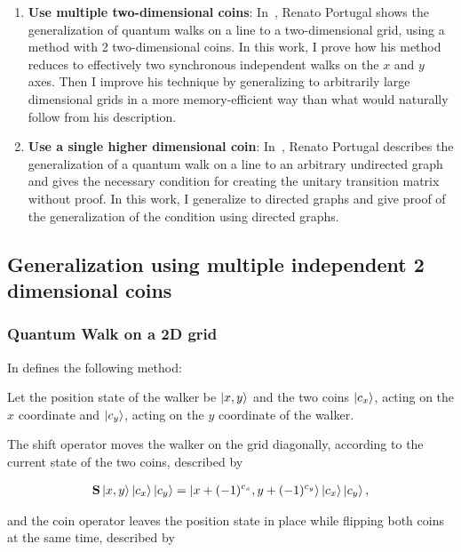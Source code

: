\begin{enumerate}
    \item \textbf{Use multiple two-dimensional coins}: In~\cite{Portugal}, Renato Portugal shows the generalization of quantum walks on a line to a two-dimensional grid, using a method with 2 two-dimensional coins. In this work, I prove how his method reduces to effectively two synchronous independent walks on the $x$ and $y$ axes. Then I improve his technique by generalizing to arbitrarily large dimensional grids in a more memory-efficient way than what would naturally follow from his description.
    \item \textbf{Use a single higher dimensional coin}: In~\cite{Portugal}, Renato Portugal describes the generalization of a quantum walk on a line to an arbitrary undirected graph and gives the necessary condition for creating the unitary transition matrix without proof. In this work, I generalize to directed graphs and give proof of the generalization of the condition using directed graphs.
\end{enumerate}

\subsection{Generalization using multiple independent 2 dimensional coins}


\subsubsection{Quantum Walk on a 2D grid}

In \cite{Portugal} defines the following method:

Let the position state of the walker be $\ket{x,y}$ and the two coins $\ket{c_x}$, acting on the $x$ coordinate and $\ket{c_y}$, acting on the $y$ coordinate of the walker.

The shift operator moves the walker on the grid diagonally, according to the current state of the two coins, described by

\begin{align}
\label{Portugal2DShift}
    \mathbf{S}\ket{x,y}\ket{c_x}\ket{c_y} = \ket{x + (-1)^{c_x}, y + (-1)^{c_y}}\ket{c_x}\ket{c_y},
\end{align}

and the coin operator leaves the position state in place while flipping both coins at the same time, described by

